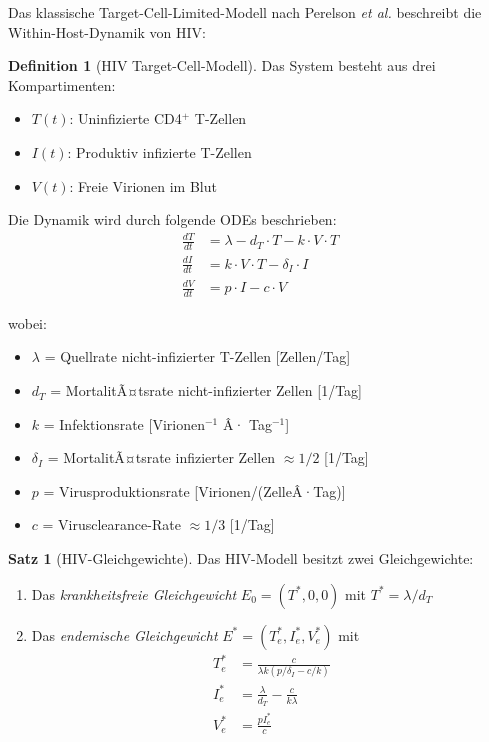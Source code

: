 ﻿\documentclass[a4paper,12pt]{article}
\theoremstyle{definition}
\newtheorem{definition}{Definition}
\newtheorem{satz}{Satz}
\begin{document}
Das klassische Target-Cell-Limited-Modell nach Perelson \textit{et al.} \cite{perelson1993dynamics} beschreibt die Within-Host-Dynamik von HIV:

\begin{definition}[HIV Target-Cell-Modell]
Das System besteht aus drei Kompartimenten:
\begin{itemize}
\item $T(t)$: Uninfizierte CD4$^+$ T-Zellen
\item $I(t)$: Produktiv infizierte T-Zellen
\item $V(t)$: Freie Virionen im Blut
\end{itemize}

Die Dynamik wird durch folgende ODEs beschrieben:
\begin{align}
\frac{dT}{dt} &= \lambda - d_T \cdot T - k \cdot V \cdot T \label{eq:hiv_t}\\
\frac{dI}{dt} &= k \cdot V \cdot T - \delta_I \cdot I \label{eq:hiv_i}\\
\frac{dV}{dt} &= p \cdot I - c \cdot V \label{eq:hiv_v}
\end{align}

wobei:
\begin{itemize}
\item $\lambda$ = Quellrate nicht-infizierter T-Zellen [Zellen/Tag]
\item $d_T$ = MortalitÃ¤tsrate nicht-infizierter Zellen [1/Tag]
\item $k$ = Infektionsrate [Virionen$^{-1}$ Â· Tag$^{-1}$]
\item $\delta_I$ = MortalitÃ¤tsrate infizierter Zellen $\approx 1/2$ [1/Tag]
\item $p$ = Virusproduktionsrate [Virionen/(ZelleÂ·Tag)]
\item $c$ = Virusclearance-Rate $\approx 1/3$ [1/Tag]
\end{itemize}
\end{definition}

\begin{satz}[HIV-Gleichgewichte]
Das HIV-Modell besitzt zwei Gleichgewichte:
\begin{enumerate}
\item Das \emph{krankheitsfreie Gleichgewicht} $E_0 = (T^*, 0, 0)$ mit $T^* = \lambda/d_T$
\item Das \emph{endemische Gleichgewicht} $E^* = (T_e^*, I_e^*, V_e^*)$ mit
\begin{align}
T_e^* &= \frac{c}{\lambda k (p/\delta_I - c/k)} \\
I_e^* &= \frac{\lambda}{d_T} - \frac{c}{k \lambda} \\
V_e^* &= \frac{p I_e^*}{c}
\end{align}
\end{enumerate}
\end{satz}
\end{document}
